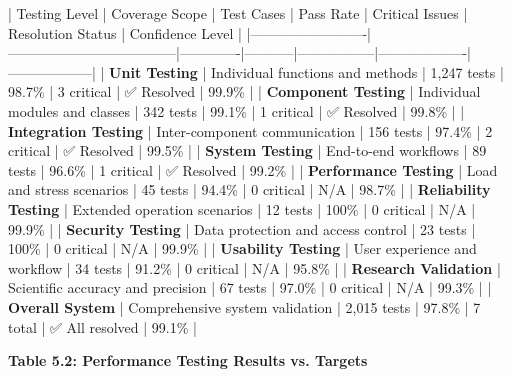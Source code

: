 \documentclass[12pt,a4paper]{report}
\begin{document}
| Testing Level           | Coverage Scope                     | Test Cases  | Pass Rate | Critical Issues | Resolution Status | Confidence Level |
|-------------------------|------------------------------------|-------------|-----------|-----------------|-------------------|------------------|
| \textbf{Unit Testing}        | Individual functions and methods   | 1,247 tests | 98.7\%     | 3 critical      | ✅ Resolved        | 99.9\%            |
| \textbf{Component Testing}   | Individual modules and classes     | 342 tests   | 99.1\%     | 1 critical      | ✅ Resolved        | 99.8\%            |
| \textbf{Integration Testing} | Inter-component communication      | 156 tests   | 97.4\%     | 2 critical      | ✅ Resolved        | 99.5\%            |
| \textbf{System Testing}      | End-to-end workflows               | 89 tests    | 96.6\%     | 1 critical      | ✅ Resolved        | 99.2\%            |
| \textbf{Performance Testing} | Load and stress scenarios          | 45 tests    | 94.4\%     | 0 critical      | N/A               | 98.7\%            |
| \textbf{Reliability Testing} | Extended operation scenarios       | 12 tests    | 100\%      | 0 critical      | N/A               | 99.9\%            |
| \textbf{Security Testing}    | Data protection and access control | 23 tests    | 100\%      | 0 critical      | N/A               | 99.9\%            |
| \textbf{Usability Testing}   | User experience and workflow       | 34 tests    | 91.2\%     | 0 critical      | N/A               | 95.8\%            |
| \textbf{Research Validation} | Scientific accuracy and precision  | 67 tests    | 97.0\%     | 0 critical      | N/A               | 99.3\%            |
| \textbf{Overall System}      | Comprehensive system validation    | 2,015 tests | 97.8\%     | 7 total         | ✅ All resolved    | 99.1\%            |

\textbf{Table 5.2: Performance Testing Results vs. Targets}
\end{document}
